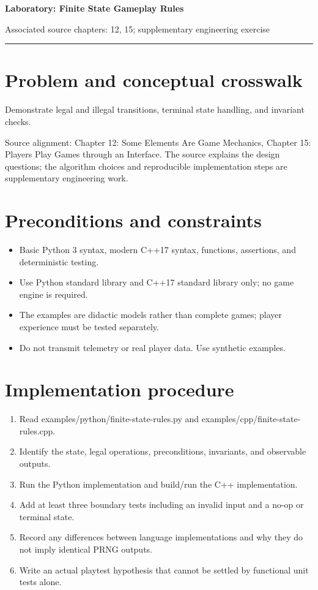 \documentclass[11pt]{article}
\begin{document}
{\huge\bfseries\color{suiteblue} Laboratory: Finite State Gameplay Rules}\par
\vspace{0.15in}
{\normalsize\color{suitegray} Associated source chapters: 12, 15; supplementary engineering exercise}\par
\vspace{0.15in}\hrule\vspace{0.15in}

\section{Problem and conceptual crosswalk}
Demonstrate legal and illegal transitions, terminal state handling, and invariant checks.

Source alignment: Chapter 12: Some Elements Are Game Mechanics, Chapter 15: Players Play Games through an Interface. The source explains the design questions; the algorithm choices and reproducible implementation steps are supplementary engineering work.


\section{Preconditions and constraints}
\begin{itemize}
\item Basic Python 3 syntax, modern C++17 syntax, functions, assertions, and deterministic testing.
\item Use Python standard library and C++17 standard library only; no game engine is required.
\item The examples are didactic models rather than complete games; player experience must be tested separately.
\item Do not transmit telemetry or real player data. Use synthetic examples.
\end{itemize}

\section{Implementation procedure}
\begin{enumerate}
\item Read examples/python/finite-state-rules.py and examples/cpp/finite-state-rules.cpp.
\item Identify the state, legal operations, preconditions, invariants, and observable outputs.
\item Run the Python implementation and build/run the C++ implementation.
\item Add at least three boundary tests including an invalid input and a no-op or terminal state.
\item Record any differences between language implementations and why they do not imply identical PRNG outputs.
\item Write an actual playtest hypothesis that cannot be settled by functional unit tests alone.
\end{enumerate}
\end{document}
